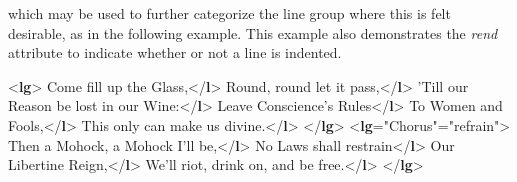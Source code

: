  which may be used to further categorize the line group where this is felt desirable, as in the following example. This example also demonstrates the {\itshape rend} attribute to indicate whether or not a line is indented. \par\bgroup{}\exampleFont \begin{shaded}\noindent\mbox{}{<\textbf{lg}>}\mbox{}\newline 
{}Come fill up the Glass,{</\textbf{l}>}\mbox{}\newline 
{}Round, round let it pass,{</\textbf{l}>}\mbox{}\newline 
{}'Till our Reason be lost in our Wine:{</\textbf{l}>}\mbox{}\newline 
{}Leave Conscience's Rules{</\textbf{l}>}\mbox{}\newline 
{}To Women and Fools,{</\textbf{l}>}\mbox{}\newline 
{}This only can make us divine.{</\textbf{l}>}\mbox{}\newline 
{</\textbf{lg}>}\mbox{}\newline 
{<\textbf{lg}\hspace*{1em}{n}="{Chorus}"\hspace*{1em}{type}="{refrain}">}\mbox{}\newline 
{}Then a Mohock, a Mohock I'll be,{</\textbf{l}>}\mbox{}\newline 
{}No Laws shall restrain{</\textbf{l}>}\mbox{}\newline 
{}Our Libertine Reign,{</\textbf{l}>}\mbox{}\newline 
{}We'll riot, drink on, and be free.{</\textbf{l}>}\mbox{}\newline 
{</\textbf{lg}>}\end{shaded}\egroup\par \par

